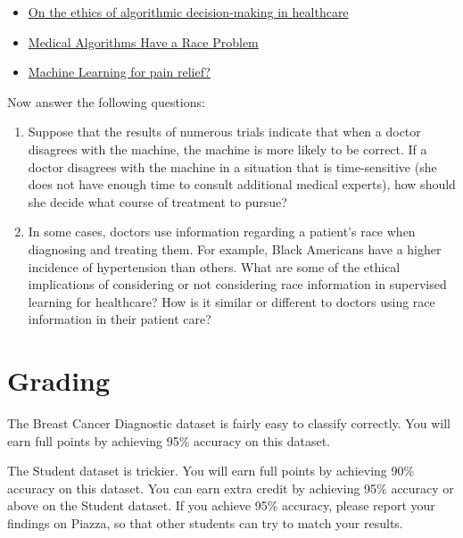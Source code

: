 \documentclass{article}
\begin{document}
\begin{itemize}
\item
  \href{https://jme.bmj.com/content/46/3/205.full}{On the ethics of algorithmic decision-making in healthcare}

\item
  \href{https://www.consumerreports.org/medical-tests/medical-algorithms-have-a-race-problem/}{Medical Algorithms Have a Race Problem}

\item
  \href{https://blogs.worldbank.org/impactevaluations/machine-learning-pain-relief}{Machine Learning for pain relief?}
\end{itemize}

\noindent
Now answer the following questions:

\begin{enumerate}
\item Suppose that the results of numerous trials indicate that when a
  doctor disagrees with the machine, the machine is more likely to be
  correct. If a doctor disagrees with the machine in a situation that
  is time-sensitive (she does not have enough time to consult
  additional medical experts), how should she decide what course of
  treatment to pursue?

\item In some cases, doctors use information regarding a patient's
  race when diagnosing and treating them. For example, Black Americans
  have a higher incidence of hypertension than others. What are some
  of the ethical implications of considering or not considering race
  information in supervised learning for healthcare? How is it similar
  or different to doctors using race information in their patient care?
\end{enumerate}


\section{Grading}

The Breast Cancer Diagnostic dataset is fairly easy to classify correctly.
You will earn full points by achieving 95\% accuracy on this dataset.

The Student dataset is trickier.
You will earn full points by achieving 90\% accuracy on this dataset.
You can earn extra credit by achieving 95\% accuracy or above on the Student dataset.
If you achieve 95\% accuracy,
please report your findings on Piazza, so that other students can try to match your results.
\end{document}
